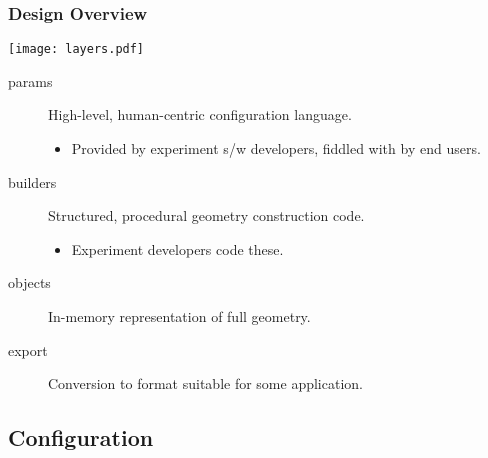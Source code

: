 \documentclass[10pt,xcolor=dvipsnames]{beamer}
\begin{document}
\begin{frame}
  \frametitle{Design Overview}

  \begin{center}
    \texttt{[image: layers.pdf]}
  \end{center}

  \begin{description}
  \item[params] High-level, human-centric configuration language.
    \begin{itemize}\scriptsize
    \item Provided by experiment s/w developers, fiddled with by end users.
    \end{itemize}
  \item[builders] Structured, procedural geometry construction code.
    \begin{itemize}\scriptsize
    \item Experiment developers code these.
    \end{itemize}
  \item[objects] In-memory representation of full geometry.
  \item[export] Conversion to format suitable for some application.
  \end{description}
\end{frame}

\subsection{Configuration}
\end{document}
